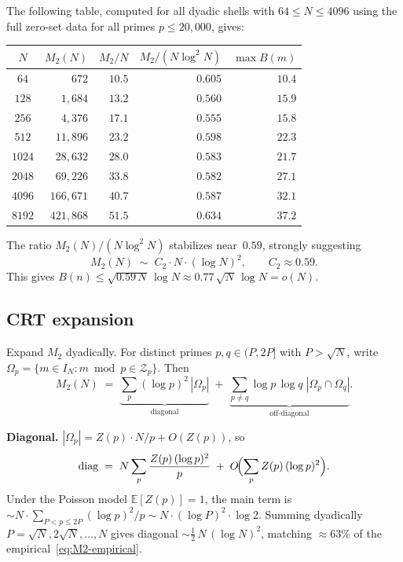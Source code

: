 \documentclass[11pt]{article}
\theoremstyle{definition}
\theoremstyle{remark}
\begin{document}
The following table, computed for all dyadic shells
with $64 \le N \le 4096$ using the full zero-set data
for all primes $p \le 20{,}000$, gives:

\begin{center}
\begin{tabular}{c|rrrr}
$N$ & $M_2(N)$ & $M_2/N$ & $M_2/(N\log^2 N)$ & $\max B(m)$ \\
\hline
$64$ & $672$ & $10.5$ & $0.605$ & $10.4$ \\
$128$ & $1{,}684$ & $13.2$ & $0.560$ & $15.9$ \\
$256$ & $4{,}376$ & $17.1$ & $0.555$ & $15.8$ \\
$512$ & $11{,}896$ & $23.2$ & $0.598$ & $22.3$ \\
$1024$ & $28{,}632$ & $28.0$ & $0.583$ & $21.7$ \\
$2048$ & $69{,}226$ & $33.8$ & $0.582$ & $27.1$ \\
$4096$ & $166{,}671$ & $40.7$ & $0.587$ & $32.1$ \\
$8192$ & $421{,}868$ & $51.5$ & $0.634$ & $37.2$
\end{tabular}
\end{center}

The ratio $M_2(N)/(N \log^2 N)$ stabilizes near~$0.59$,
strongly suggesting
\begin{equation}\label{eq:M2-empirical}
  M_2(N) \;\sim\; C_2\cdot N\cdot (\log N)^2,
  \qquad C_2 \approx 0.59.
\end{equation}
This gives $B(n) \le \sqrt{0.59\,N}\,\log N \approx
0.77\,\sqrt{N}\,\log N = o(N)$.

\subsection{CRT expansion}

Expand $M_2$ dyadically. For distinct primes
$p, q \in (P, 2P]$ with $P > \sqrt{N}$, write
$\Omega_p = \{m \in I_N : m \bmod p \in \mathcal{Z}_p\}$.
Then
\[
  M_2(N) \;=\;
  \underbrace{\sum_p (\log p)^2\,|\Omega_p|}_{\text{diagonal}}
  \;+\; \underbrace{\sum_{p \ne q} \log p\,\log q\;
  |\Omega_p \cap \Omega_q|}_{\text{off-diagonal}}.
\]

\textbf{Diagonal.}
$|\Omega_p| = Z(p)\cdot N/p + O(Z(p))$, so
\[
  \text{diag} \;=\; N\sum_p \frac{Z(p)\,(\log p)^2}{p}
  \;+\; O\!\Bigl(\sum_p Z(p)\,(\log p)^2\Bigr).
\]
Under the Poisson model $\mathbb{E}[Z(p)] = 1$,
the main term is $\sim N\cdot \sum_{P < p \le 2P}
(\log p)^2/p \sim N\cdot (\log P)^2\cdot\log 2$.
Summing dyadically $P = \sqrt{N}, 2\sqrt{N}, \ldots, N$
gives diagonal $\sim \frac{1}{2}\,N\,(\log N)^2$,
matching $\approx 63\%$ of the
empirical~\eqref{eq:M2-empirical}.
\end{document}
